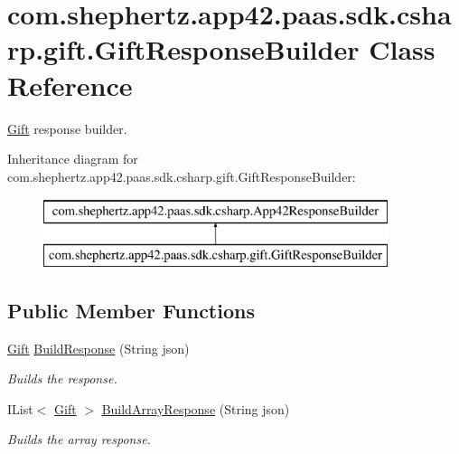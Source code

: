 \hypertarget{classcom_1_1shephertz_1_1app42_1_1paas_1_1sdk_1_1csharp_1_1gift_1_1_gift_response_builder}{\section{com.\+shephertz.\+app42.\+paas.\+sdk.\+csharp.\+gift.\+Gift\+Response\+Builder Class Reference}
\label{classcom_1_1shephertz_1_1app42_1_1paas_1_1sdk_1_1csharp_1_1gift_1_1_gift_response_builder}
}


\hyperlink{classcom_1_1shephertz_1_1app42_1_1paas_1_1sdk_1_1csharp_1_1gift_1_1_gift}{Gift} response builder.  


Inheritance diagram for com.\+shephertz.\+app42.\+paas.\+sdk.\+csharp.\+gift.\+Gift\+Response\+Builder\+:\begin{figure}[H]
\begin{center}
\leavevmode
\includegraphics[height=2.000000cm]{classcom_1_1shephertz_1_1app42_1_1paas_1_1sdk_1_1csharp_1_1gift_1_1_gift_response_builder}
\end{center}
\end{figure}
\subsection*{Public Member Functions}
\begin{DoxyCompactItemize}
\item 
\hyperlink{classcom_1_1shephertz_1_1app42_1_1paas_1_1sdk_1_1csharp_1_1gift_1_1_gift}{Gift} \hyperlink{classcom_1_1shephertz_1_1app42_1_1paas_1_1sdk_1_1csharp_1_1gift_1_1_gift_response_builder_a93af0220df17de0ba356c95b91e9ced1}{Build\+Response} (String json)
\begin{DoxyCompactList}\small\item\em Builds the response. \end{DoxyCompactList}\item 
I\+List$<$ \hyperlink{classcom_1_1shephertz_1_1app42_1_1paas_1_1sdk_1_1csharp_1_1gift_1_1_gift}{Gift} $>$ \hyperlink{classcom_1_1shephertz_1_1app42_1_1paas_1_1sdk_1_1csharp_1_1gift_1_1_gift_response_builder_a32675257ad35970db5871710dcffbdad}{Build\+Array\+Response} (String json)
\begin{DoxyCompactList}\small\item\em Builds the array response. \end{DoxyCompactList}\end{DoxyCompactItemize}



